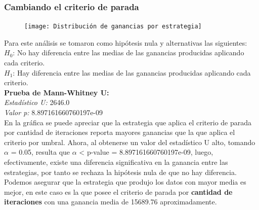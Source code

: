 \documentclass[12pt,a4paper]{article} \usepackage[spanish]{babel} \usepackage{graphicx} \usepackage{amsmath} \usepackage{amsfonts} \usepackage{amssymb} \usepackage{float} \usepackage{geometry}
\begin{document}
\subsubsection{Cambiando el criterio de parada}

\begin{figure}[H] \centering \texttt{[image: Distribución de ganancias por estrategia]} \caption{} \label{fig:etiqueta} \end{figure}

Para este análisis se tomaron como hipótesis nula y alternativas las siguientes:\\
$H_0$: No hay diferencia entre las medias de las ganancias producidas aplicando cada criterio.\\
$H_1$: Hay diferencia entre las medias de las ganancias producidas aplicando cada criterio.\\
\textbf{Prueba de Mann-Whitney U:}\\
\textit{Estadístico U:} 2646.0\\
\textit{Valor p:} 8.897161660760197e-09\\
En la gráfica se puede apreciar que la estrategia que aplica el criterio de parada por cantidad de iteraciones reporta mayores ganancias que la que aplica el criterio por umbral. Ahora, al obtenerse un valor del estadístico U alto, tomando $\alpha$ = 0.05, resulta que $\alpha$ < p-value = 8.897161660760197e-09, luego, efectivamente, existe una diferencia significativa en la ganancia entre las estrategias, por tanto se rechaza la hipótesis nula de que no hay diferencia. Podemos asegurar que la estrategia que produjo los datos con mayor media es mejor, en este caso es la que posee el criterio de parada por \textbf{cantidad de iteraciones} con una ganancia media de 15689.76 aproximadamente.
\end{document}
